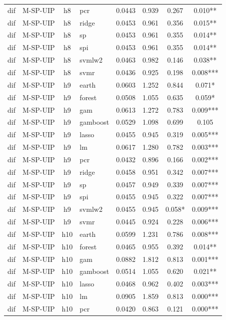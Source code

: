 \begin{ThreePartTable}
\begin{longtable}[t]{llclcccc}
dif & M-SP-UIP & h8 & pcr & 0.0443 & 0.939 & 0.267 & 0.010**\\
dif & M-SP-UIP & h8 & ridge & 0.0453 & 0.961 & 0.356 & 0.015**\\
dif & M-SP-UIP & h8 & sp & 0.0453 & 0.961 & 0.355 & 0.014**\\
dif & M-SP-UIP & h8 & spi & 0.0453 & 0.961 & 0.355 & 0.014**\\
dif & M-SP-UIP & h8 & svmlw2 & 0.0463 & 0.982 & 0.146 & 0.038**\\
dif & M-SP-UIP & h8 & svmr & 0.0436 & 0.925 & 0.198 & 0.008***\\
\addlinespace
dif & M-SP-UIP & h9 & earth & 0.0603 & 1.252 & 0.844 & 0.071*\\
dif & M-SP-UIP & h9 & forest & 0.0508 & 1.055 & 0.635 & 0.059*\\
dif & M-SP-UIP & h9 & gam & 0.0613 & 1.272 & 0.783 & 0.009***\\
dif & M-SP-UIP & h9 & gamboost & 0.0529 & 1.098 & 0.699 & 0.105\\
dif & M-SP-UIP & h9 & lasso & 0.0455 & 0.945 & 0.319 & 0.005***\\
dif & M-SP-UIP & h9 & lm & 0.0617 & 1.280 & 0.782 & 0.003***\\
dif & M-SP-UIP & h9 & pcr & 0.0432 & 0.896 & 0.166 & 0.002***\\
dif & M-SP-UIP & h9 & ridge & 0.0458 & 0.951 & 0.342 & 0.007***\\
dif & M-SP-UIP & h9 & sp & 0.0457 & 0.949 & 0.339 & 0.007***\\
dif & M-SP-UIP & h9 & spi & 0.0455 & 0.945 & 0.322 & 0.007***\\
dif & M-SP-UIP & h9 & svmlw2 & 0.0455 & 0.945 & 0.058* & 0.009***\\
dif & M-SP-UIP & h9 & svmr & 0.0445 & 0.924 & 0.228 & 0.006***\\
\addlinespace
dif & M-SP-UIP & h10 & earth & 0.0599 & 1.231 & 0.786 & 0.008***\\
dif & M-SP-UIP & h10 & forest & 0.0465 & 0.955 & 0.392 & 0.014**\\
dif & M-SP-UIP & h10 & gam & 0.0882 & 1.812 & 0.813 & 0.001***\\
dif & M-SP-UIP & h10 & gamboost & 0.0514 & 1.055 & 0.620 & 0.021**\\
dif & M-SP-UIP & h10 & lasso & 0.0468 & 0.962 & 0.402 & 0.003***\\
dif & M-SP-UIP & h10 & lm & 0.0905 & 1.859 & 0.813 & 0.000***\\
dif & M-SP-UIP & h10 & pcr & 0.0420 & 0.863 & 0.121 & 0.000***\\

\end{longtable}
\end{ThreePartTable}
